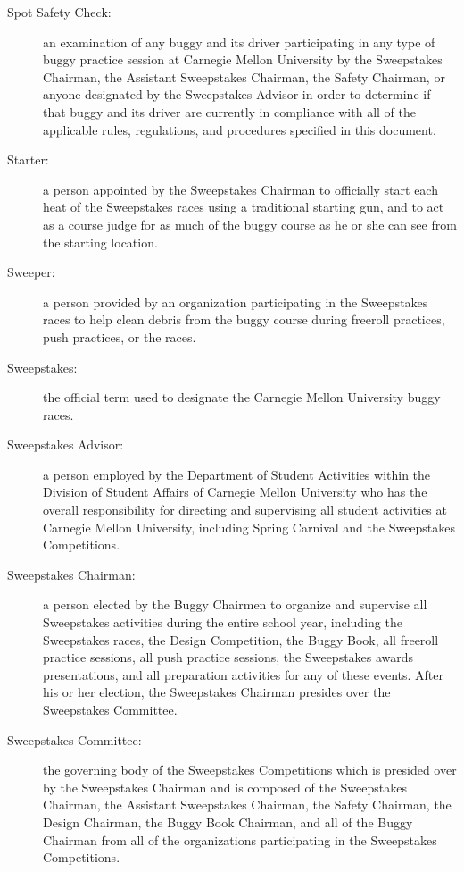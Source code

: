 \begin{description}
	\item[Spot Safety Check:]
	an examination of any buggy and its driver participating in any type of
	buggy practice session at Carnegie Mellon University by the Sweepstakes
	Chairman, the Assistant Sweepstakes Chairman, the Safety Chairman, or anyone
	designated by the Sweepstakes Advisor in order to determine if that buggy and
	its driver are currently in compliance with all of the applicable rules,
	regulations, and procedures specified in this document.

	\item[Starter:]
	a person appointed by the Sweepstakes Chairman to officially start each
	heat of the Sweepstakes races using a traditional starting gun, and to act as a
	course judge for as much of the buggy course as he or she can see from the
	starting location.

	\item[Sweeper:]
	a person provided by an organization participating in the Sweepstakes races
	to help clean debris from the buggy course during freeroll practices, push
	practices, or the races.

	\item[Sweepstakes:]
	the official term used to designate the Carnegie Mellon University buggy
	races.

	\item[Sweepstakes Advisor:]
	a person employed by the Department of Student Activities within the
	Division of Student Affairs of Carnegie Mellon University who has the overall
	responsibility for directing and supervising all student activities at Carnegie
	Mellon University, including Spring Carnival and the Sweepstakes Competitions.

	\item[Sweepstakes Chairman:]
	a person elected by the Buggy Chairmen to organize and supervise all
	Sweepstakes activities during the entire school year, including the Sweepstakes
	races, the Design Competition, the Buggy Book, all freeroll practice sessions,
	all push practice sessions, the Sweepstakes awards presentations, and all
	preparation activities for any of these events. After his or her election, the
	Sweepstakes Chairman presides over the Sweepstakes Committee.

	\item[Sweepstakes Committee:]
	the governing body of the Sweepstakes Competitions which is presided over
	by the Sweepstakes Chairman and is composed of the Sweepstakes Chairman, the
	Assistant Sweepstakes Chairman, the Safety Chairman, the Design Chairman, the
	Buggy Book Chairman, and all of the Buggy Chairman from all of the
	organizations participating in the Sweepstakes Competitions.


\end{description}
